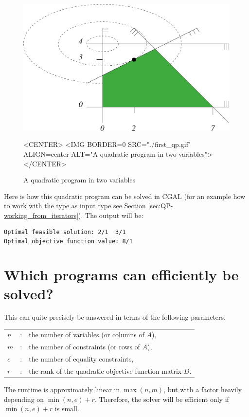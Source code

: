 \begin{figure}[htbp]
\begin{ccTexOnly}
\begin{center}
\includegraphics{QP_solver/first_qp} %
\end{center}
\end{ccTexOnly}
\caption{A quadratic program in two variables
\label{fig:QP-first_qp}}

\begin{ccHtmlOnly}
<CENTER>
<IMG BORDER=0 SRC="./first_qp.gif" ALIGN=center ALT="A quadratic program in two variables">
</CENTER>
\end{ccHtmlOnly}
\end{figure}

Here is how this quadratic program can be solved in CGAL (for an example
how to work with the type  as input type see Section 
\ref{sec:QP-working_from_iterators}).
The output will be:
\begin{verbatim}
Optimal feasible solution: 2/1  3/1
Optimal objective function value: 8/1
\end{verbatim}



\section{Which programs can efficiently be solved?}
\label{sec:QP-efficiency}
This can quite precisely be answered in terms of the following
parameters.
\begin{tabular}{lcl}
$n$ &: & the number of variables (or columns of $A$),\\
$m$ &: &the number of constraints (or rows of $A$),\\
$e$ &: &the number of equality constraints,\\
$r$ &: &the rank of the quadratic objective function matrix $D$.
\end{tabular}
The runtime is approximately linear in $\max(n,m)$, 
but with a factor heavily depending on $\min(n,e)+r$.
Therefore, the solver will be efficient only if $\min(n,e)+r$ is small.

